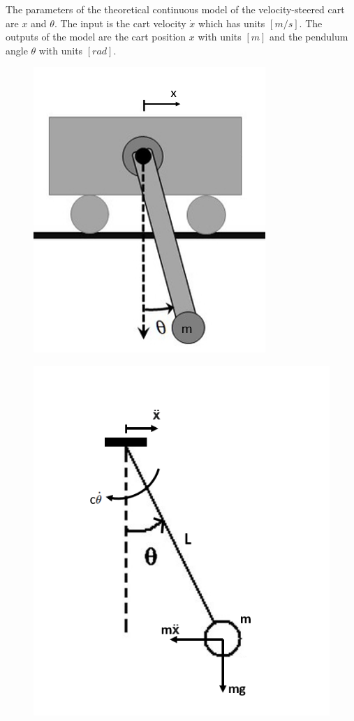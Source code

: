 \documentclass[a4paper,kul]{kulakarticle} %
\begin{document}
\noindent The parameters of the theoretical continuous model of the velocity-steered cart are $x$ and $\theta$. The input is the cart velocity $\dot{x}$ which has units $[m/s]$. The outputs of the model are the cart position $x$ with units $[m]$ and the pendulum angle $\theta$ with units $[rad]$. 
\begin{figure}[htp!]
	\centering
	\begin{minipage}{.5\textwidth}
		\centering
		\includegraphics[width=.8\linewidth]{pendulumoncart.png}
		\label{fig:pendulumoncart}
	\end{minipage}%
	\begin{minipage}{.5\textwidth}
		\centering
		\includegraphics[width=0.8\linewidth]{VLDpendulum.png}

\end{minipage}
\end{figure}
\end{document}
